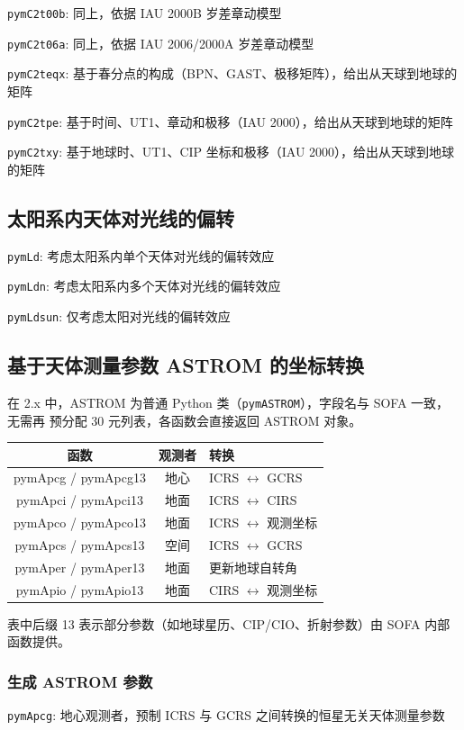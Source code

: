 \documentclass[11pt]{article}
\begin{document}
\texttt{pymC2t00b}: 同上，依据 IAU 2000B 岁差章动模型

\texttt{pymC2t06a}: 同上，依据 IAU 2006/2000A 岁差章动模型

\texttt{pymC2teqx}: 基于春分点的构成（BPN、GAST、极移矩阵），给出从天球到地球的矩阵

\texttt{pymC2tpe}: 基于时间、UT1、章动和极移（IAU 2000），给出从天球到地球的矩阵

\texttt{pymC2txy}: 基于地球时、UT1、CIP 坐标和极移（IAU 2000），给出从天球到地球的矩阵

\subsection{太阳系内天体对光线的偏转}
\texttt{pymLd}: 考虑太阳系内单个天体对光线的偏转效应

\texttt{pymLdn}: 考虑太阳系内多个天体对光线的偏转效应

\texttt{pymLdsun}: 仅考虑太阳对光线的偏转效应

\subsection{基于天体测量参数 ASTROM 的坐标转换}
在 2.x 中，ASTROM 为普通 Python 类（\texttt{pymASTROM}），字段名与 SOFA 一致，无需再
预分配 30 元列表，各函数会直接返回 ASTROM 对象。

\begin{table}[H]
\centering
\begin{tabular}{|c|c|l|}
\hline
函数 & 观测者 & 转换 \\ \hline
pymApcg / pymApcg13 & 地心 & ICRS $\leftrightarrow$ GCRS \\ \hline
pymApci / pymApci13 & 地面 & ICRS $\leftrightarrow$ CIRS \\ \hline
pymApco / pymApco13 & 地面 & ICRS $\leftrightarrow$ 观测坐标 \\ \hline
pymApcs / pymApcs13 & 空间 & ICRS $\leftrightarrow$ GCRS \\ \hline
pymAper / pymAper13 & 地面 & 更新地球自转角 \\ \hline
pymApio / pymApio13 & 地面 & CIRS $\leftrightarrow$ 观测坐标 \\ \hline
\end{tabular}
\end{table}
表中后缀 13 表示部分参数（如地球星历、CIP/CIO、折射参数）由 SOFA 内部函数提供。

\subsubsection{生成 ASTROM 参数}
\texttt{pymApcg}: 地心观测者，预制 ICRS 与 GCRS 之间转换的恒星无关天体测量参数
\end{document}
